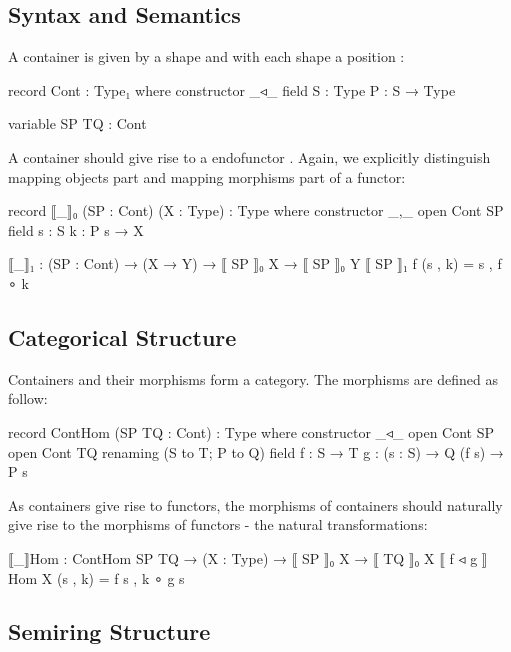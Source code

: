 \subsection{Syntax and Semantics}

A container is given by a shape  and with each shape a position :

\begin{code}
record Cont : Type₁ where
  constructor _◃_
  field
    S : Type
    P : S → Type
\end{code}

\begin{code}[hide]
variable SP TQ : Cont
\end{code}

A container should give rise to a endofunctor   . Again, we explicitly distinguish mapping objects part and mapping morphisms part of a functor:

\begin{code}
record ⟦_⟧₀ (SP : Cont) (X : Type) : Type where
  constructor _,_
  open Cont SP
  field
    s : S
    k : P s → X

⟦_⟧₁ : (SP : Cont) → (X → Y) → ⟦ SP ⟧₀ X → ⟦ SP ⟧₀ Y
⟦ SP ⟧₁ f (s , k) = s , f ∘ k
\end{code}

\subsection{Categorical Structure}

Containers and their morphisms form a category. The morphisms are defined as follow:

\begin{code}
record ContHom (SP TQ : Cont) : Type where
  constructor _◃_
  open Cont SP
  open Cont TQ renaming (S to T; P to Q)
  field
    f : S → T
    g : (s : S) → Q (f s) → P s
\end{code}

As containers give rise to functors, the morphisms of containers should naturally give rise to the morphisms of functors - the natural transformations:

\begin{code}
⟦_⟧Hom : ContHom SP TQ → (X : Type) → ⟦ SP ⟧₀ X → ⟦ TQ ⟧₀ X
⟦ f ◃ g ⟧Hom X (s , k) = f s , k ∘ g s
\end{code}

\subsection{Semiring Structure}

